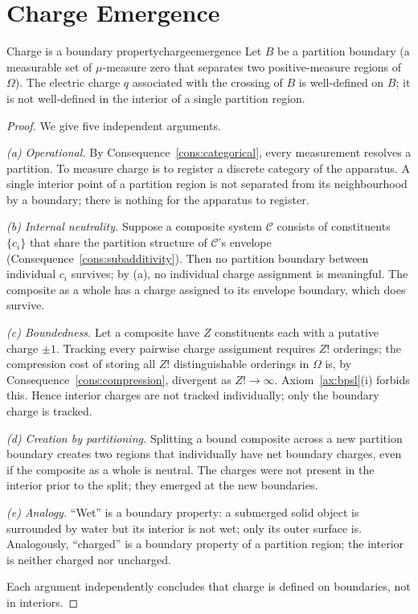 \section{Charge Emergence}
\label{sec:chargeemergence}

\begin{consequence}{Charge is a boundary property}{chargeemergence}
Let $B$ be a partition boundary (a measurable set of $\mu$-measure zero that separates two positive-measure regions of $\Omega$). The electric charge $q$ associated with the crossing of $B$ is well-defined on $B$; it is not well-defined in the interior of a single partition region.
\end{consequence}

\begin{proof}
We give five independent arguments.

\emph{(a) Operational.} By Consequence~\ref{cons:categorical}, every measurement resolves a partition. To measure charge is to register a discrete category of the apparatus. A single interior point of a partition region is not separated from its neighbourhood by a boundary; there is nothing for the apparatus to register.

\emph{(b) Internal neutrality.} Suppose a composite system $\mathcal{C}$ consists of constituents $\{c_{i}\}$ that share the partition structure of $\mathcal{C}$'s envelope (Consequence~\ref{cons:subadditivity}). Then no partition boundary between individual $c_{i}$ survives; by (a), no individual charge assignment is meaningful. The composite as a whole has a charge assigned to its envelope boundary, which does survive.

\emph{(c) Boundedness.} Let a composite have $Z$ constituents each with a putative charge $\pm 1$. Tracking every pairwise charge assignment requires $Z!$ orderings; the compression cost of storing all $Z!$ distinguishable orderings in $\Omega$ is, by Consequence~\ref{cons:compression}, divergent as $Z!\to\infty$. Axiom~\ref{ax:bpsl}(i) forbids this. Hence interior charges are not tracked individually; only the boundary charge is tracked.

\emph{(d) Creation by partitioning.} Splitting a bound composite across a new partition boundary creates two regions that individually have net boundary charges, even if the composite as a whole is neutral. The charges were not present in the interior prior to the split; they emerged at the new boundaries.

\emph{(e) Analogy.} ``Wet'' is a boundary property: a submerged solid object is surrounded by water but its interior is not wet; only its outer surface is. Analogously, ``charged'' is a boundary property of a partition region; the interior is neither charged nor uncharged.

Each argument independently concludes that charge is defined on boundaries, not in interiors.
\end{proof}

